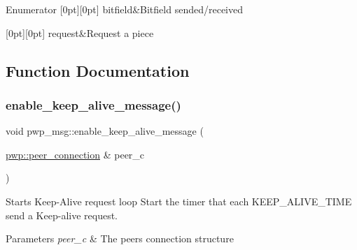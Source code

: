 \begin{DoxyEnumFields}{Enumerator}
[0pt][0pt]{}\mbox{\label{namespacepwp__msg_a0b9a29508f00a30e5138d2b78f4b1dafac3a2343a7b67a371e241ae2184bfe9cd}} 
bitfield&Bitfield sended/received \\
\hline

[0pt][0pt]{}\mbox{\label{namespacepwp__msg_a0b9a29508f00a30e5138d2b78f4b1dafa4d6478c4fe948a9f3aa3ce8d09974370}} 
request&Request a piece \\
\hline

\end{DoxyEnumFields}


\subsection{Function Documentation}
\mbox{\label{namespacepwp__msg_a30c14bc06a8bb851ca79781cb9686b4f}} 
\subsubsection{\texorpdfstring{enable\+\_\+keep\+\_\+alive\+\_\+message()}{enable\_keep\_alive\_message()}}
{\footnotesize\ttfamily void pwp\+\_\+msg\+::enable\+\_\+keep\+\_\+alive\+\_\+message (\begin{DoxyParamCaption}\item[{\hyperlink{structpwp_1_1peer__connection}{pwp\+::peer\+\_\+connection} \&}]{peer\+\_\+c }\end{DoxyParamCaption})}



Starts Keep-\/\+Alive request loop Start the timer that each K\+E\+E\+P\+\_\+\+A\+L\+I\+V\+E\+\_\+\+T\+I\+ME send a Keep-\/alive request. 


\begin{DoxyParams}{Parameters}
{\em peer\+\_\+c} & The peer\textquotesingle{}s connection structure \\
\hline
\end{DoxyParams}
\mbox{\label{namespacepwp__msg_aec35de04a2f2d9cb6abdd777917cfaae}} 
